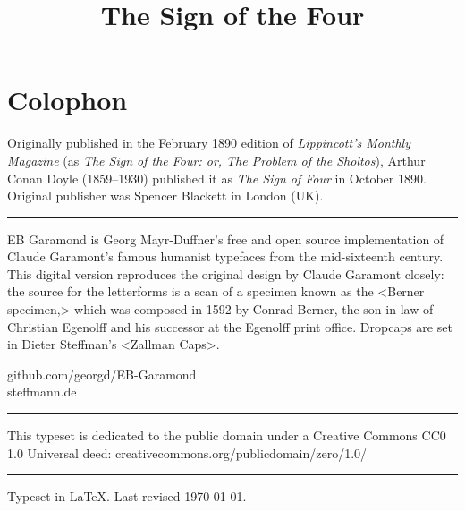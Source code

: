 \documentclass[
a5paper,
]{scrbook} %
\title{The Sign of the Four}
\begin{document}

  \begin{titlepage}
   
  \end{titlepage}


\tableofcontents
\thispagestyle{empty}



\pagestyle{headings}
\renewcommand*{\chapterpagestyle}{plain}
















\chapter*{Colophon}

\centering
\vfill
\begin{minipage}{\textwidth}
Originally published in the February 1890 edition of \textit{Lippincott's Monthly Magazine} (as \textit{The Sign of the Four: or, The Problem of the Sholtos}), Arthur Conan Doyle (1859--1930) published it as \textit{The Sign of Four} in October 1890. Original publisher was Spencer Blackett in London (UK).
\end{minipage}
\vfill
\rule{0.5\textwidth}{.4pt}
\vfill
\begin{minipage}{\textwidth}
EB Garamond is Georg Mayr-Duffner's free and open source implementation of Claude Garamont's famous humanist typefaces from the mid-sixteenth century. This digital version reproduces the original design by Claude Garamont closely: the source for the letterforms is a scan of a specimen known as the <Berner specimen,> which was composed in 1592 by Conrad Berner, the son-in-law of Christian Egenolff and his successor at the Egenolff print office. Dropcaps are set in Dieter Steffman's <Zallman Caps>.
\end{minipage}
github.com/georgd/EB-Garamond\\
steffmann.de
\vfill
\rule{0.5\textwidth}{.4pt}
\vfill
\begin{minipage}{\textwidth}
This typeset is dedicated to the public domain under a Creative Commons CC0 1.0 Universal deed: creativecommons.org/publicdomain/zero/1.0/
\end{minipage}
\vfill
\rule{0.5\textwidth}{.4pt}
\vfill
Typeset in \LaTeX{}. Last revised \today.
\thispagestyle{empty}
\end{document}
